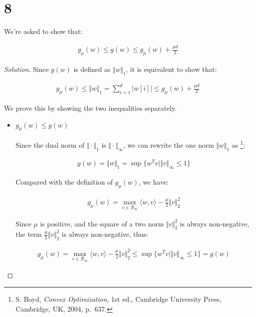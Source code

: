 \documentclass{article}
\newenvironment{solution}
  {\renewcommand\qedsymbol{$\blacksquare$}\begin{proof}[Solution]}
  {\end{proof}}
\begin{document}
\section*{8}

We're asked to show that:

\begin{align*}
    g_\mu(w) \leq g(w) \leq g_\mu(w) + \frac{\mu d}{2} 
\end{align*}

\begin{solution}

    Since $g(w)$ is defined as $\Vert w \Vert_1$, it is equivalent to show that:

    \begin{align*}
        g_\mu(w) \leq \Vert w \Vert_1  = \sum_{i=1}^d \vert w[i] \vert \leq g_\mu(w) + \frac{\mu d}{2} 
    \end{align*} 

    We prove this by showing the two inequalities separately.

    \begin{itemize}
        \item \underline{$g_\mu(w) \leq g(w)$} 
        \bigskip

        Since the dual norm of $\Vert \cdot \Vert_1$ is $\Vert \cdot \Vert_\infty$, 
        we can rewrite the one norm $\Vert w \Vert_1$ as
        \footnote{S. Boyd, \textit{Convex Optimization}, 1st ed., Cambridge University Press, Cambridge, UK, 2004, p.~637.}:

        \begin{align*}
            g(w) = \Vert w \Vert_1 = \sup \{w^T v \mid \Vert v \Vert_\infty \leq 1\}
        \end{align*}
        
        Compared with the definition of $g_\mu(w)$, we have:

        \begin{align*}
            g_\mu(w) = \max_{v \in \mathcal{B}_\infty} \langle w, v \rangle - \frac{\mu}{2} \Vert v \Vert_2^2
        \end{align*}

        Since $\mu$ is positive, and the square of a two norm $\Vert v \Vert_2^2$ is always non-negative, 
        the term $\frac{\mu}{2} \Vert v \Vert_2^2$ is always non-negative, thus:

        \begin{align*}
            g_\mu(w) = \max_{v \in \mathcal{B}_\infty} \langle w, v \rangle - \frac{\mu}{2} \Vert v \Vert_2^2 
            \leq \sup \{w^T v \mid \Vert v \Vert_\infty \leq 1\} = g(w)
        \end{align*}


\end{itemize}
\end{solution}
\end{document}
